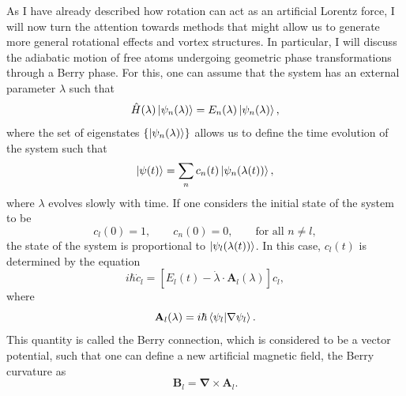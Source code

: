 As I have already described how rotation can act as an artificial Lorentz force, I will now turn the attention towards methods that might allow us to generate more general rotational effects and vortex structures.
In particular, I will discuss the adiabatic motion of free atoms undergoing geometric phase transformations through a Berry phase. 
For this, one can assume that the system has an external parameter $\lambda$ such that
\begin{equation}
\hat H(\lambda) \ket{\psi_n(\lambda)} = E_n(\lambda)\ket{\psi_n(\lambda)},
\end{equation}
where the set of eigenstates $\left\{ \ket{\psi_n(\lambda)} \right\}$ allows us to define the time evolution of the system such that
\begin{equation}
\ket{\psi(t)} = \sum_n c_n(t) \ket{\psi_n(\lambda(t))},
\end{equation}
where $\lambda$ evolves slowly with time. If one considers the initial state of the system to be
\begin{equation}
c_l(0) = 1,
\qquad
c_n(0) = 0, 
\qquad
\text{for all } n\neq l,
\end{equation}
the state of the system is proportional to $\ket{\psi_l(\lambda(t))}$.
In this case, $c_l(t)$ is determined by the equation
\begin{equation}
i \hbar \dot{c}_l =  [E_l(t) - \dot{\lambda} \cdot \mathbf{A}_l(\lambda)]c_l,
\label{Bcnx-1}
\end{equation}
where 
\begin{equation}
\mathbf{A}_l(\lambda) = i \hbar \braket{\psi_l|\nabla\psi_l}.
\label{eqn:Bcnx}
\end{equation}
This quantity is called the Berry connection, which is considered to be a vector potential, such that one can define a new artificial magnetic field, the Berry curvature as
\begin{equation}
\mathbf{B}_l = \mathbf{\nabla} \times \mathbf{A}_l.
\label{eqn:BC}
\end{equation}

